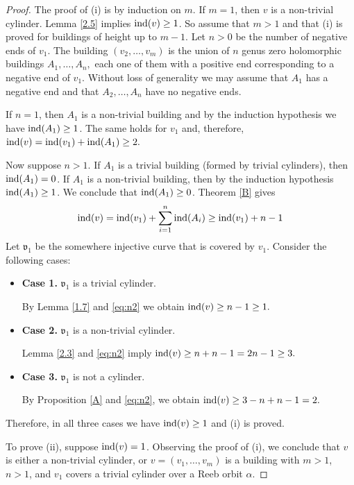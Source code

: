 \documentclass{amsart}
\newcommand{\ind}{\textnormal{ind}}
\begin{document}
\begin{proof}
 The proof of (i) is by induction on $m$. If $m=1$, then $v$ is a non-trivial cylinder. Lemma \ref{2.5} implies $\ind(v) \geq 1$. So assume that $m>1$ and that (i) is proved for buildings of height up to $m-1$. Let $n>0$ be the number of negative ends of $v_1$. The building $(v_2, \ldots, v_m)$ is the union of $n$ genus zero holomorphic buildings $A_1, \ldots, A_n,$ each one of them with a positive end corresponding to a negative end of $v_1$. Without loss of generality we may assume that $A_1$ has a negative end and that $A_2, \ldots, A_n$ have no negative ends.

If $n=1$, then $A_1$ is a non-trivial building and by the induction hypothesis we have $\ind(A_1)\geq 1$. The same holds for $v_1$ and, therefore,
 $\ind(v)=\ind(v_1)+\ind(A_1)\geq 2.$ 

Now suppose $n>1$. If $A_1$ is a trivial building (formed by trivial cylinders), then $\ind(A_1)=0$. If $A_1$ is a non-trivial building, then by the induction hypothesis $\ind(A_1)\geq 1$. We conclude that $\ind(A_1)\geq 0$. Theorem \ref{B} gives
\begin{equation}
\ind(v)=\ind(v_1)+\sum_{i=1}^n \ind(A_i) \geq \ind(v_1)+n-1
\label{eq:n2}
\end{equation}
Let $\mathfrak{v}_1$ be the somewhere injective curve that is covered by $v_1$. Consider the following cases:
\begin{itemize}
\item {\bf Case 1.} $\mathfrak{v}_1$ is a trivial cylinder. 

By Lemma \ref{1.7} and \eqref{eq:n2} we obtain
$\ind(v)\geq n-1 \geq 1.$

\item {\bf Case 2.} $\mathfrak{v}_1$ is a non-trivial cylinder. 

Lemma \ref{2.3} and  \eqref{eq:n2} imply
$\ind(v)\geq n+n-1=2n-1\geq 3.$

\item {\bf Case 3.} $\mathfrak{v}_1$ is not a cylinder.

By Proposition \ref{A} and  \eqref{eq:n2}, we obtain
$\ind(v)\geq 3-n+n-1=2.$
\end{itemize}
Therefore, in all three cases we have $\ind(v)\geq 1$ and (i) is proved.

To prove (ii), suppose $\ind(v)=1$. Observing  the proof of (i), we conclude that $v$ is either a non-trivial cylinder, or  $v=(v_1,\ldots,v_m)$ is a building with $m>1$, $n>1$, and $v_1$ covers a trivial cylinder over a Reeb orbit $\alpha$.


\end{proof}
\end{document}
